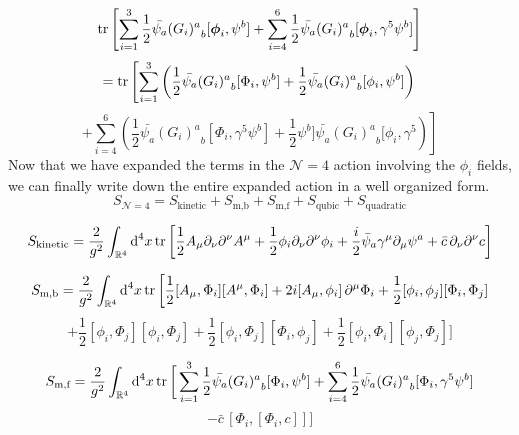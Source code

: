 %
%
\begin{equation*}
\tr \left[
\sum_{i=1}^3 \frac{1}{2} \bar{\psi_a} {(G_i)^a}_b [\boldsymbol{\phi}_i, \psi^b]
+
\sum_{i=4}^6 \frac{1}{2} \bar{\psi_a} {(G_i)^a}_b [\boldsymbol{\phi}_i, \gamma^5 \psi^b]
\right]
\end{equation*}
%
%
\begin{equation*}
= 
\tr \left[
\sum_{i=1}^3 \left(
\frac{1}{2} \bar{\psi_a} {(G_i)^a}_b [\Phi_i, \psi^b]
+
\frac{1}{2} \bar{\psi_a} {(G_i)^a}_b [\phi_i, \psi^b]
\right)
\right.
\end{equation*}
%
%
\begin{equation}
\left.
+
\sum_{i=4}^6 \left(
\frac{1}{2} \bar{\psi_a} {(G_i)^a}_b [\Phi_i, \gamma^5 \psi^b]
+
\frac{1}{2}  \psi^b] \bar{\psi_a} {(G_i)^a}_b [\phi_i, \gamma^5
\right)
\right]
\end{equation}
%
%
Now that we have expanded the terms in the $\mathcal{N} = 4$ action involving the $\phi_i$ fields, we can finally write down the entire expanded action in a well organized form.
%
%
\begin{equation}\label{expanded action}
S_{\mathcal{N}=4} = S_{\text{kinetic}} + S_{\text{m,b}} + S_{\text{m,f}}
+ S_{\text{qubic}} + S_{\text{quadratic}}
\end{equation}
%
%

%
%
\begin{equation}
S_{\text{kinetic}}
=
\frac{2}{g^2} \int_{\mathbb{R}^4} \text{d}^4 x
\tr \bigg[
\frac{1}{2} A_\mu \partial_\nu \partial^\nu A^\mu
+ \frac{1}{2} \phi_i \partial_\nu \partial^\nu \phi_i
+ \frac{i}{2} \bar{\psi}_a \gamma^\mu \partial_\mu \psi^a
+ \bar{c} \, \partial_\nu \partial^\nu c
\bigg]
\end{equation}
%
%

%
%
\begin{equation*}
S_{\text{m,b}}
=
\frac{2}{g^2} \int_{\mathbb{R}^4} \text{d}^4 x
\tr \bigg[
\frac{1}{2} [A_\mu, \Phi_i] [ A^\mu, \Phi_i]
+ 2 i [A_\mu, \phi_i] \, \partial^\mu \Phi_i
+ \frac{1}{2} [\phi_i, \phi_j][\Phi_i, \Phi_j]
\end{equation*}
%
%
\begin{equation}\label{boson mass terms}
+ \frac{1}{2} [\phi_i, \Phi_j][\phi_i, \Phi_j]
+ \frac{1}{2} [\phi_i, \Phi_j][\Phi_i, \phi_j]
+ \frac{1}{2} [\phi_i, \Phi_i] [\phi_j, \Phi_j]
\bigg]
\end{equation}
%
%

%
%
\begin{equation*}
S_{\text{m,f}}
=
\frac{2}{g^2} \int_{\mathbb{R}^4} \text{d}^4 x
\tr \bigg[
\sum_{i=1}^3 \frac{1}{2} \bar{\psi_a} {(G_i)^a}_b [\Phi_i, \psi^b]
+
\sum_{i=4}^6 \frac{1}{2} \bar{\psi_a} {(G_i)^a}_b [\Phi_i, \gamma^5 \psi^b]
\end{equation*}
%
%
\begin{equation}\label{fermion mass terms}
-
\bar{c} \, [\Phi_i, [\Phi_i, c]]
\bigg]
\end{equation}
%
%

